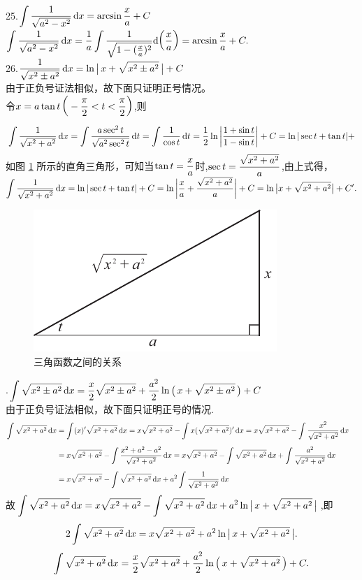 25.\enspace$\displaystyle\int\frac{1}{\sqrt{a^2-x^2}} \,{\rm{d}} x=\arcsin \frac{x}{a}+C$\\[1em]
\proof $\displaystyle\int \frac{1}{\sqrt{a^2-x^2}} \,{\rm{d}} x=\frac{1}{a}\int\frac{1}{\sqrt{1-(\frac{x}{a})^2}}{\rm{d}} \bigg(\frac{x}{a}\bigg)=\arcsin \frac{x}{a}+C.$\\[1em]
26.\enspace $\displaystyle\frac{1}{\sqrt{x^2\pm a^2}} \,{\rm{d}} x=\ln \big| \, x+\sqrt{x^2\pm a^2}\,\big|+C$\\[1em]
\proof 由于正负号证法相似，故下面只证明正号情况。\\
令$x=a\tan t \, \bigg(\displaystyle-\frac{\pi}{2}<t<\frac{\pi}{2}\bigg)$,则
$$
\displaystyle \int \frac{1}{\sqrt{x^2+a^2}} \,{\rm{d}} x=\int\frac{a\sec^2 t}{\sqrt{a^2\sec^2t}} \,{\rm{d}} t=\int \frac{1}{\cos t} \,{\rm{d}} t=\frac{1}{2}\ln \bigg|\frac{1+\sin t}{1-\sin t}\bigg|+C=\ln |\sec t+\tan t|+
$$
如图 \ref{retri} 所示的直角三角形，可知当$\tan t=\displaystyle\frac{x}{a}$时,$\sec t=\displaystyle\frac{\sqrt{x^2+a^2}}{a}$,由上式得，\\[1em]
$\displaystyle\int\frac{1}{\sqrt{x^2+a^2}}\,{\rm{d}} x=\ln|\sec t+\tan t|+C=\ln\bigg|\frac{x}{a}+\frac{\sqrt{x^2+a^2}}{a}\bigg|+C=\ln\big|x+\sqrt{x^2+a^2}\big|+C'.$\\[1em]
\begin{figure}
	\centering
	\includegraphics[width = 0.4\linewidth]{pic/C-3/retri}
	\vspace*{-1em}
	\caption{三角函数之间的关系}
	\label{retri}
\end{figure}

.\enspace $\displaystyle\int \sqrt{x^2\pm a^2} \,{\rm{d}} x=\frac{x}{2}\sqrt{x^2\pm a^2}+\frac{a^2}{2}\ln\big(\, x+\sqrt{x^2\pm a^2}\,\big)+C$\\[1em]
\proof 由于正负号证法相似，故下面只证明正号的情况.
\begin{align*}
\int \sqrt{x^2+a^2} \,{\rm{d}} x &=\int (x)'\sqrt{x^2+a^2} \,{\rm{d}} x=x\sqrt{x^2+a^2}-\int x(\sqrt{x^2+a^2})' \,{\rm{d}} x=x\sqrt{x^2+a^2}-\int\frac{x^2}{\sqrt{x^2+a^2}} \,{\rm{d}} x&\\[0.5em]
&=x\sqrt{x^2+a^2}-\int\frac{x^2+a^2-a^2}{\sqrt{x^2+a^2}} \,{\rm{d}} x=x\sqrt{x^2+a^2}-\int\sqrt{x^2+a^2} \,{\rm{d}} x+\int \frac{a^2}{\sqrt{x^2+a^2}} \,{\rm{d}} x&\\[0.5em]
&=x\sqrt{x^2+a^2}-\int \sqrt{x^2+a^2} \,{\rm{d}} x+a^2\int\frac{1}{\sqrt{x^2+a^2}} \,{\rm{d}} x&
\end{align*}
故$\displaystyle\int\sqrt{x^2+a^2} \,{\rm{d}} x=x\sqrt{x^2+a^2}-\int\sqrt{x^2+a^2} \,{\rm{d}} x+a^2\ln\big|\, x+\sqrt{x^2+a^2}\,\big|$,即
\begin{equation}
	\nonumber
	2\int\sqrt{x^2+a^2} \,{\rm{d}} x=x\sqrt{x^2+a^2}+a^2\ln\big|\, x+\sqrt{x^2+a^2}\,\big|.
\end{equation}
\begin{equation}
	\nonumber
	\int \sqrt{x^2+a^2} \,{\rm{d}} x=\frac{x}{2}\sqrt{x^2+a^2}+\frac{a^2}{2}\ln\left( \, x+\sqrt{x^2+a^2}\,\right)+C.
\end{equation}
\vspace*{0.5em}


